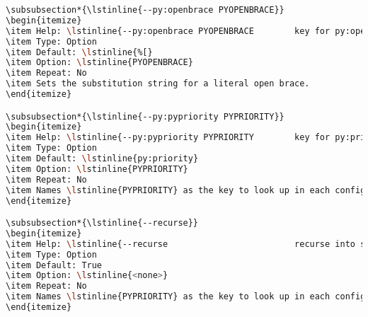 \begin{snugshade}
\begin{lstlisting}[language=bash]
\subsubsection*{\lstinline{--py:openbrace PYOPENBRACE}}
\begin{itemize}
\item Help: \lstinline{--py:openbrace PYOPENBRACE        key for py:openbrace}
\item Type: Option
\item Default: \lstinline{%[}
\item Option: \lstinline{PYOPENBRACE}
\item Repeat: No
\item Sets the substitution string for a literal open brace.
\end{itemize}

\subsubsection*{\lstinline{--py:pypriority PYPRIORITY}}
\begin{itemize}
\item Help: \lstinline{--py:pypriority PYPRIORITY        key for py:priority}
\item Type: Option
\item Default: \lstinline{py:priority}
\item Option: \lstinline{PYPRIORITY}
\item Repeat: No
\item Names \lstinline{PYPRIORITY} as the key to look up in each configuration section for checking to see if a section applies to a folder.
\end{itemize}

\subsubsection*{\lstinline{--recurse}}
\begin{itemize}
\item Help: \lstinline{--recurse                         recurse into subfolders}
\item Type: Option
\item Default: True
\item Option: \lstinline{<none>}
\item Repeat: No
\item Names \lstinline{PYPRIORITY} as the key to look up in each configuration section for checking to see if a section applies to a folder.
\end{itemize}


\end{lstlisting}
\end{snugshade}
